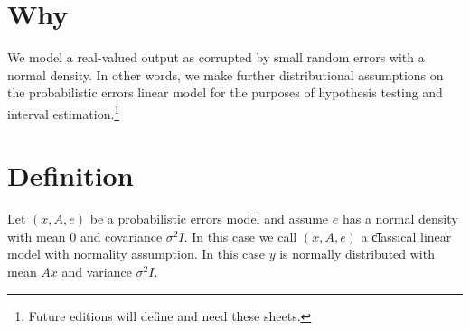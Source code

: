 
\section*{Why}

We model a real-valued output as corrupted by small random errors with a normal density.
In other words, we make further distributional assumptions on the probabilistic errors linear model for the purposes of hypothesis testing and interval estimation.\footnote{Future editions will define and need these sheets.}

\section*{Definition}

Let $(x, A, e)$ be a probabilistic errors model and assume $e$ has a normal density with mean $0$ and covariance $\sigma ^2I$.
In this case we call $(x, A, e)$ a \t{classical linear model with normality assumption}.
In this case $y$ is normally distributed with mean $Ax$ and variance $\sigma ^2I$.

\blankpage